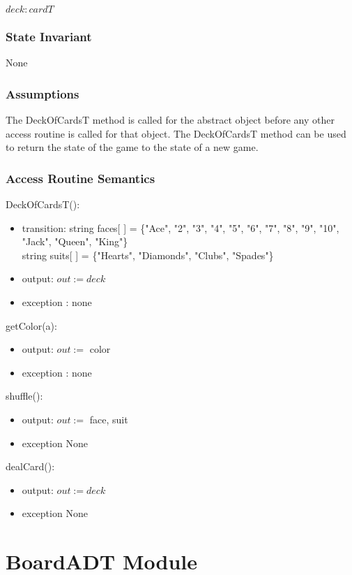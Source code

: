 \documentclass[12pt]{article}
\begin{document}
$deck : cardT$

\subsubsection* {State Invariant}

None

\subsubsection* {Assumptions}

The DeckOfCardsT method is called for the abstract object before any other access routine is called for that
object.  The DeckOfCardsT method can be used to return the state of the game to the state of a new game.

\subsubsection* {Access Routine Semantics}

DeckOfCardsT():
\begin{itemize}
	\item transition: 
	string faces[ ] = \{"Ace", "2", "3", "4", "5", "6", "7", "8", "9", "10", "Jack", "Queen", "King"\}\\
	string suits[ ] = \{"Hearts", "Diamonds", "Clubs", "Spades"\}
	\item output:
	$out := \mathit{deck}$
	\item exception :
	none

\end{itemize}

getColor(a):
\begin{itemize}
	\item output: 
	$out :=$ color
	\item exception :
	none
\end{itemize}

shuffle():
\begin{itemize}
	\item output: 
	$out :=$ face, suit
	\item exception
	None
\end{itemize}

dealCard():
\begin{itemize}
	\item output: 
	$out := deck$
	\item exception
	None
\end{itemize}


\newpage
\section* {BoardADT Module}
\end{document}
